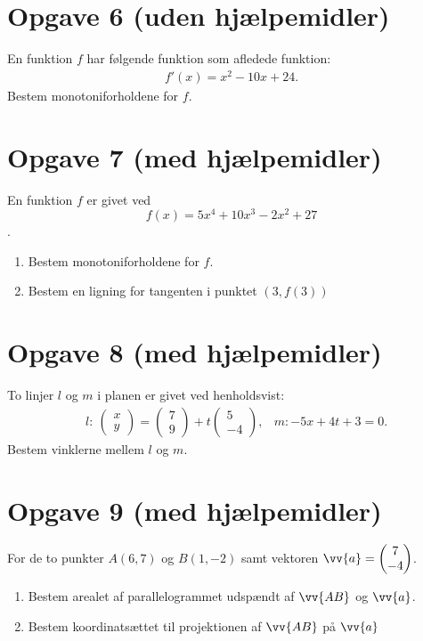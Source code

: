 \section*{Opgave 6 \large (uden hjælpemidler) }
En funktion $f$ har følgende funktion som afledede funktion:
\begin{align*}
f'(x) = x^2-10x+24.
\end{align*}
Bestem monotoniforholdene for $f$. 

\section*{Opgave 7 \large (med hjælpemidler) }
En funktion $f$ er givet ved 
$$f(x)= 5x^4+10x^3-2x^2+27$$. 
\begin{enumerate}[label=\roman*)]
\item Bestem monotoniforholdene for $f$. 
\item Bestem en ligning for tangenten i punktet $(3,f(3))$
\end{enumerate}

\section*{Opgave 8 \large (med hjælpemidler) }
To linjer $l$ og $m$ i planen er givet ved henholdsvist:
\begin{align*}
&l:\  \begin{pmatrix} x\\y \end{pmatrix} = \begin{pmatrix} 7\\9 \end{pmatrix} +t\begin{pmatrix} 5\\-4 \end{pmatrix},
&m: -5x+4t+3=0.
\end{align*}
Bestem vinklerne mellem $l$ og $m$.

\section*{Opgave 9 \large (med hjælpemidler) }
For de to punkter $A(6,7)$ og $B(1,-2)$ samt vektoren $\vv{a} = \begin{pmatrix}
7\\-4
\end{pmatrix}$.
\begin{enumerate}[label=\roman*)]
\item Bestem arealet af parallelogrammet udspændt af $\vv{AB}$ og $\vv{a}$.
\item Bestem koordinatsættet til projektionen af $\vv{AB}$ på $\vv{a}$
\end{enumerate}
